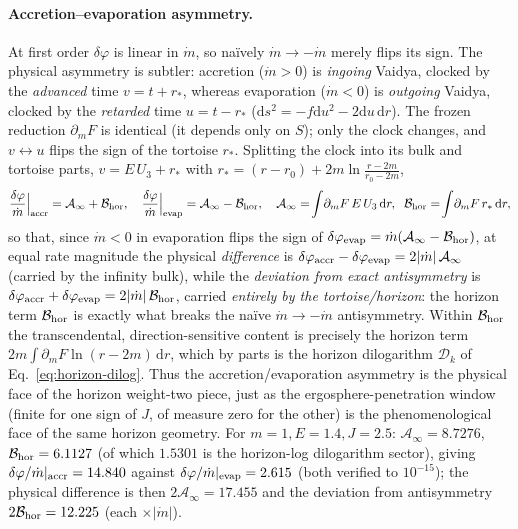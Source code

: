 \documentclass[12pt]{iopart}
\newcommand{\dd}{\mathrm{d}}
\begin{document}
\paragraph{Accretion--evaporation asymmetry.} At first order $\delta\varphi$ is
linear in $\dot m$, so na\"ively $\dot m\to-\dot m$ merely flips its sign. The
physical asymmetry is subtler: accretion ($\dot m>0$) is \emph{ingoing} Vaidya,
clocked by the \emph{advanced} time $v=t+r_*$, whereas evaporation ($\dot m<0$) is
\emph{outgoing} Vaidya, clocked by the \emph{retarded} time $u=t-r_*$
($\dd s^2=-f\dd u^2-2\dd u\,\dd r$). The frozen reduction $\partial_m F$ is identical
(it depends only on $S$); only the clock changes, and $v\leftrightarrow u$ flips the
sign of the tortoise $r_*$. Splitting the clock into its bulk and tortoise parts,
$v=E\,U_3+r_*$ with $r_*=(r-r_0)+2m\ln\!\frac{r-2m}{r_0-2m}$,
\begin{equation}
    \frac{\delta\varphi}{\dot m}\Big|_{\rm accr}=\mathcal{A}_\infty+\mathcal{B}_{\rm hor},
    \quad
    \frac{\delta\varphi}{\dot m}\Big|_{\rm evap}=\mathcal{A}_\infty-\mathcal{B}_{\rm hor},
    \quad
    \mathcal{A}_\infty=\!\int\!\partial_m F\,E\,U_3\,\dd r,\;\;
    \mathcal{B}_{\rm hor}=\!\int\!\partial_m F\,r_*\,\dd r,
    \label{eq:vaidya-asymmetry}
\end{equation}
so that, since $\dot m<0$ in evaporation flips the sign of
$\delta\varphi_{\rm evap}=\dot m(\mathcal{A}_\infty-\mathcal{B}_{\rm hor})$, at equal
rate magnitude the physical \emph{difference} is
$\delta\varphi_{\rm accr}-\delta\varphi_{\rm evap}=2|\dot m|\,\mathcal{A}_\infty$
(carried by the infinity bulk), while the \emph{deviation from exact antisymmetry} is
$\delta\varphi_{\rm accr}+\delta\varphi_{\rm evap}=2|\dot m|\,\mathcal{B}_{\rm hor}$,
carried \emph{entirely by the tortoise/horizon}: the horizon term $\mathcal{B}_{\rm hor}$
is exactly what breaks the na\"ive $\dot m\to-\dot m$ antisymmetry. Within
$\mathcal{B}_{\rm hor}$ the transcendental, direction-sensitive content is precisely
the horizon term $2m\!\int\!\partial_m F\ln(r-2m)\,\dd r$, which by parts is the
horizon dilogarithm $\mathcal{D}_k$ of Eq.~\eqref{eq:horizon-dilog}. Thus the
accretion/evaporation asymmetry is the physical face of the horizon weight-two piece,
just as the ergosphere-penetration window (finite for one sign of $J$, of measure zero
for the other) is the phenomenological face of the same horizon geometry. For
$m=1,E=1.4,J=2.5$: $\mathcal{A}_\infty=8.7276$, $\mathcal{B}_{\rm hor}=6.1127$ (of which
$1.5301$ is the horizon-log dilogarithm sector), giving
$\delta\varphi/\dot m|_{\rm accr}=14.840$ against
$\delta\varphi/\dot m|_{\rm evap}=2.615$ (both verified to $10^{-15}$); the physical
difference is then $2\mathcal{A}_\infty=17.455$ and the deviation from antisymmetry
$2\mathcal{B}_{\rm hor}=12.225$ (each $\times|\dot m|$).
\end{document}
